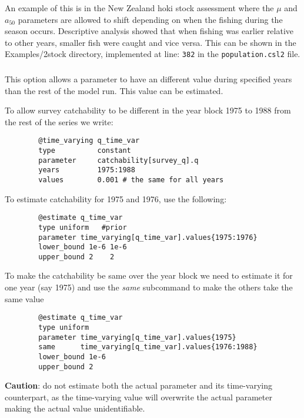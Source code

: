 An example of this is in the New Zealand hoki stock assessment where the $\mu$ and $a_{50}$ parameters are allowed to shift depending on when the fishing during the season occurs. Descriptive analysis showed that when fishing was earlier relative to other years, smaller fish were caught and vice versa. This can be shown in the Examples/2stock directory, implemented at line: \texttt{382} in the \texttt{population.csl2} file.

\subsubsection[Constant (year blocks)]{}\label{sec:TimeVarying-Constant}

This option allows a parameter to have an different value during specified years than the rest of the model run. This value can be estimated.

To allow survey catchability to be different in the year block 1975 to 1988 from the rest of the series we write:

{\small{\begin{verbatim}
		@time_varying q_time_var
		type          constant
		parameter     catchability[survey_q].q
		years         1975:1988
		values        0.001 # the same for all years
		\end{verbatim}}}

To estimate catchability for 1975 and 1976, use the following:

{\small{\begin{verbatim}
		@estimate q_time_var
		type uniform   #prior
		parameter time_varying[q_time_var].values{1975:1976}
		lower_bound 1e-6 1e-6
		upper_bound 2    2
		\end{verbatim}}}

To make the catchability be same over the year block we need to estimate it for one year (say 1975) and use the \textit{same} subcommand to make the others take the same value

{\small{\begin{verbatim}
		@estimate q_time_var
		type uniform
		parameter time_varying[q_time_var].values{1975}
		same      time_varying[q_time_var].values{1976:1988}
		lower_bound 1e-6
		upper_bound 2
		\end{verbatim}}}

\textbf{Caution}: do not estimate both the actual parameter and its time-varying counterpart, as the time-varying value will overwrite the actual parameter making the actual value unidentifiable. 

